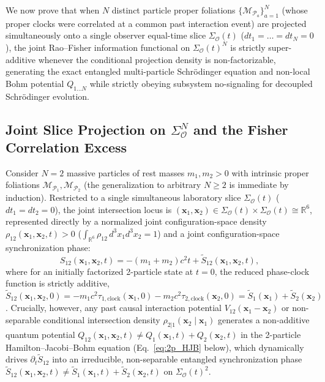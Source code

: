 \documentclass[11pt, a4paper]{article}
\theoremstyle{definition}
\begin{document}
We now prove that when $N$ distinct particle proper foliations $\{\mathcal{M}_{\mathcal{P}_a}\}_{a=1}^N$ (whose proper clocks were correlated at a common past interaction event) are projected simultaneously onto a single observer equal-time slice $\Sigma_{\mathcal{O}}(t)$ ($dt_1 = \dots = dt_N = 0$), the joint Rao--Fisher information functional on $\Sigma_{\mathcal{O}}(t)^N$ is strictly super-additive whenever the conditional projection density is non-factorizable, generating the exact entangled multi-particle Schr\"{o}dinger equation and non-local Bohm potential $Q_{1\dots N}$ while strictly obeying subsystem no-signaling for decoupled Schr\"{o}dinger evolution.

\subsection{\texorpdfstring{Joint Slice Projection on $\Sigma_{\mathcal{O}}^N$ and the Fisher Correlation Excess}{Joint Slice Projection on Sigma\_O\textasciicircum N and the Fisher Correlation Excess}}

Consider $N = 2$ massive particles of rest masses $m_1, m_2 > 0$ with intrinsic proper foliations $\mathcal{M}_{\mathcal{P}_1}, \mathcal{M}_{\mathcal{P}_2}$ (the generalization to arbitrary $N \ge 2$ is immediate by induction). Restricted to a single simultaneous laboratory slice $\Sigma_{\mathcal{O}}(t)$ ($dt_1 = dt_2 = 0$), the joint intersection locus is $(\mathbf{x}_1, \mathbf{x}_2) \in \Sigma_{\mathcal{O}}(t) \times \Sigma_{\mathcal{O}}(t) \cong \mathbb{R}^6$, represented directly by a normalized joint configuration-space density $\rho_{12}(\mathbf{x}_1, \mathbf{x}_2, t) > 0$ ($\int_{\mathbb{R}^6} \rho_{12}\,d^3x_1 d^3x_2 = 1$) and a joint configuration-space synchronization phase:
\begin{equation}
\label{eq:joint_S12}
S_{12}(\mathbf{x}_1, \mathbf{x}_2, t) = -(m_1 + m_2)c^2 t + \tilde{S}_{12}(\mathbf{x}_1, \mathbf{x}_2, t),
\end{equation}
where for an initially factorized 2-particle state at $t = 0$, the reduced phase-clock function is strictly additive, $\tilde{S}_{12}(\mathbf{x}_1, \mathbf{x}_2, 0) = -m_1 c^2 \tau_{1,\text{clock}}(\mathbf{x}_1, 0) - m_2 c^2 \tau_{2,\text{clock}}(\mathbf{x}_2, 0) = \tilde{S}_1(\mathbf{x}_1) + \tilde{S}_2(\mathbf{x}_2)$. Crucially, however, any past causal interaction potential $V_{12}(\mathbf{x}_1 - \mathbf{x}_2)$ or non-separable conditional intersection density $\rho_{2|1}(\mathbf{x}_2 \mid \mathbf{x}_1)$ generates a non-additive quantum potential $Q_{12}(\mathbf{x}_1, \mathbf{x}_2, t) \neq Q_1(\mathbf{x}_1, t) + Q_2(\mathbf{x}_2, t)$ in the 2-particle Hamilton--Jacobi--Bohm equation (Eq.~\eqref{eq:2p_HJB} below), which dynamically drives $\partial_t \tilde{S}_{12}$ into an irreducible, non-separable entangled synchronization phase $\tilde{S}_{12}(\mathbf{x}_1, \mathbf{x}_2, t) \neq \tilde{S}_1(\mathbf{x}_1, t) + \tilde{S}_2(\mathbf{x}_2, t)$ on $\Sigma_{\mathcal{O}}(t)^2$.
\end{document}
